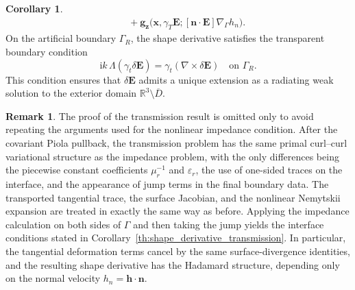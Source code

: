 \documentclass[12pt,reqno]{amsart}
\theoremstyle{definition}
\newtheorem{coro}[theo]{Corollary}
\newtheorem{rema}[theo]{ Remark}
\numberwithin{equation}{section}
\begin{document}
\begin{coro}
\begin{equation}
\begin{aligned}
&\quad + \mathbf{g}_{\boldsymbol{z}} \bigl( \boldsymbol{x}, \gamma_T \mathbf{E}; [ \mathbf{n} \cdot \mathbf{E} ] \nabla_\Gamma h_n \bigr).
\end{aligned}
\end{equation}
On the artificial boundary $\Gamma_R$, the shape derivative satisfies the transparent boundary condition
\begin{equation}
\label{eq:shape_transmission_radiation}
\mathrm{i}k \, \Lambda(\gamma_t \delta\mathbf{E}) = \gamma_t (\nabla \times \delta\mathbf{E}) \quad \text{on } \Gamma_R.
\end{equation}
This condition ensures that $\delta\mathbf{E}$ admits a unique extension as a radiating weak solution to the exterior domain $\mathbb{R}^3 \setminus \overline{D}$.
\end{coro}
\begin{rema}
The proof of the transmission result is omitted only to avoid repeating the
arguments used for the nonlinear impedance condition. After the covariant
Piola pullback, the transmission problem has the same primal curl--curl
variational structure as the impedance problem, with the only differences
being the piecewise constant coefficients \(\mu_r^{-1}\) and \(\varepsilon_r\),
the use of one-sided traces on the interface, and the appearance of jump
terms in the final boundary data. The transported tangential trace, the
surface Jacobian, and the nonlinear Nemytskii expansion are treated in exactly
the same way as before. Applying the impedance calculation on both sides of
\(\Gamma\) and then taking the jump yields the interface conditions stated in
Corollary~\ref{th:shape_derivative_transmission}. In particular, the tangential
deformation terms cancel by the same surface-divergence identities, and the
resulting shape derivative has the Hadamard structure, depending only on the
normal velocity \(h_n=\mathbf h\cdot\mathbf n\). 
\end{rema}
\end{document}
